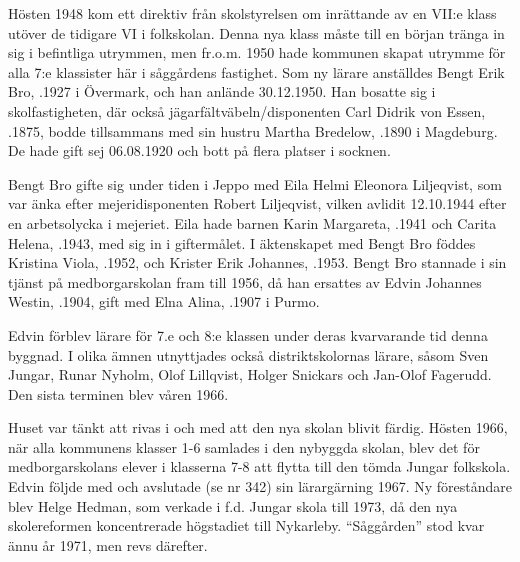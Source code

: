 Hösten 1948 kom ett direktiv från skolstyrelsen om inrättande av en VII:e klass utöver de tidigare VI i folkskolan. Denna nya klass måste till en början tränga in sig i befintliga utrymmen, men fr.o.m. 1950 hade kommunen skapat utrymme för alla 7:e klassister här i såggårdens fastighet. Som ny lärare anställdes Bengt Erik Bro, .1927 i Övermark, och han anlände 30.12.1950. Han bosatte sig i skolfastigheten, där också jägarfältväbeln/disponenten Carl Didrik von Essen, .1875, bodde tillsammans med sin hustru Martha Bredelow, .1890 i Magdeburg. De hade gift sej 06.08.1920 och bott på flera platser i socknen.

Bengt Bro gifte sig under tiden i Jeppo med Eila Helmi Eleonora Liljeqvist, som var änka efter mejeridisponenten Robert Liljeqvist, vilken
avlidit 12.10.1944 efter en arbetsolycka i mejeriet. Eila hade barnen Karin Margareta, .1941 och Carita Helena, .1943, med sig in i giftermålet. I äktenskapet med Bengt Bro föddes Kristina Viola, .1952, och Krister Erik Johannes, .1953. Bengt Bro stannade i sin tjänst på medborgarskolan fram till 1956, då han ersattes av Edvin Johannes Westin, .1904, gift med Elna Alina, .1907 i Purmo.
\begin{jhchildren}
  \item {}
  \item {}
  \item {}
\end{jhchildren}

Edvin förblev lärare för 7.e och  8:e klassen under deras kvarvarande tid denna byggnad. I olika ämnen utnyttjades också distriktskolornas lärare, såsom Sven Jungar, Runar Nyholm, Olof Lillqvist, Holger Snickars och Jan-Olof Fagerudd. Den sista terminen blev våren 1966.

Huset var tänkt att rivas i och med att den nya skolan blivit färdig. Hösten 1966, när alla kommunens klasser 1-6 samlades i den nybyggda skolan, blev det för medborgarskolans elever i klasserna 7-8 att flytta till den tömda Jungar folkskola. Edvin följde med och avslutade (se nr 342) sin lärargärning 1967. Ny föreståndare blev Helge Hedman, som verkade i f.d. Jungar skola till 1973, då den nya skolereformen koncentrerade högstadiet till Nykarleby. ``Såggården'' stod kvar ännu år 1971, men revs därefter.



